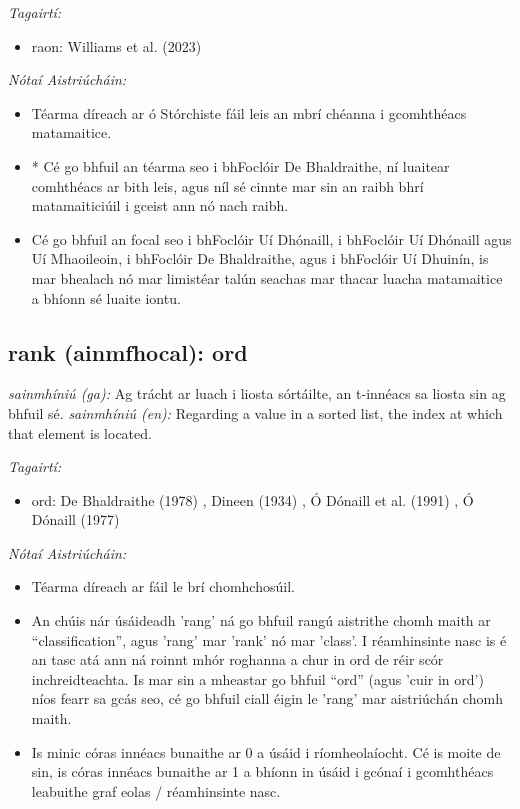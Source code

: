 \documentclass{article}
\begin{document}
 \noindent \textit{Tagairtí:}
\begin{itemize}
	\item raon: Williams et al. (2023) \cite{storchiste}
\end{itemize}

 \noindent \textit{Nótaí Aistriúcháin:}
\begin{itemize}
	\item Téarma díreach ar ó Stórchiste fáil leis an mbrí chéanna i gcomhthéacs matamaitice.
	\item * Cé go bhfuil an téarma seo i bhFoclóir De Bhaldraithe, ní luaitear comhthéacs ar bith leis, agus níl sé cinnte mar sin an raibh bhrí matamaiticiúil i gceist ann nó nach raibh.
	\item Cé go bhfuil an focal seo i bhFoclóir Uí Dhónaill, i bhFoclóir Uí Dhónaill agus Uí Mhaoileoin, i bhFoclóir De Bhaldraithe, agus i bhFoclóir Uí Dhuinín, is mar bhealach nó mar limistéar talún seachas mar thacar luacha matamaitice a bhíonn sé luaite iontu.
\end{itemize}


\subsection*{rank (ainmfhocal): ord} 
 \noindent \textit{sainmhíniú (ga):} Ag trácht ar luach i liosta sórtáilte, an t-innéacs sa liosta sin ag bhfuil sé.
\newline\newline
 \noindent \textit{sainmhíniú (en):} Regarding a value in a sorted list, the index at which that element is located.
\newline

 \noindent \textit{Tagairtí:}
\begin{itemize}
	\item ord: De Bhaldraithe (1978) \cite{de-bhaldraithe}, Dineen (1934) \cite{dineen}, Ó Dónaill et al. (1991) \cite{focloir-beag}, Ó Dónaill (1977) \cite{odonaill}
\end{itemize}

 \noindent \textit{Nótaí Aistriúcháin:}
\begin{itemize}
	\item Téarma díreach ar fáil le brí chomhchosúil.
	\item An chúis nár úsáideadh 'rang' ná go bhfuil rangú aistrithe chomh maith ar “classification”, agus 'rang' mar 'rank' nó mar 'class'. I réamhinsinte nasc is é an tasc atá ann ná roinnt mhór roghanna a chur in ord de réir scór inchreidteachta. Is mar sin a mheastar go bhfuil “ord” (agus 'cuir in ord') níos fearr sa gcás seo, cé go bhfuil ciall éigin le 'rang' mar aistriúchán chomh maith.
	\item Is minic córas innéacs bunaithe ar 0 a úsáid i ríomheolaíocht. Cé is moite de sin, is córas innéacs bunaithe ar 1 a bhíonn in úsáid i gcónaí i gcomhthéacs leabuithe graf eolas / réamhinsinte nasc.
\end{itemize}
\end{document}
